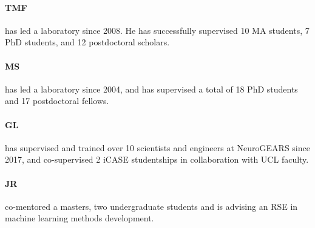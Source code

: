 \paragraph{TMF} has led a laboratory since 2008. He has
successfully supervised 10 MA students, 7 PhD students, and 12 postdoctoral
scholars.

\paragraph{MS} has led a laboratory since 2004, and has supervised a total of 18 PhD students and
17 postdoctoral fellows.

\paragraph{GL} has supervised and trained over 10 scientists and engineers at NeuroGEARS since 2017, and co-supervised 2 iCASE studentships in collaboration with UCL faculty.

\paragraph{JR} co-mentored a masters, two undergraduate
students and is advising an RSE in machine learning methods development.
